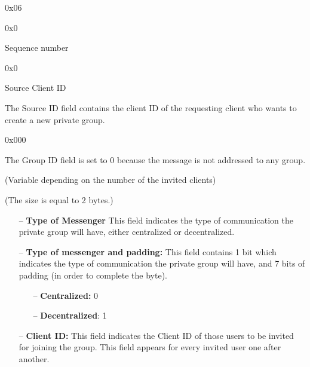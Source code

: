 \documentclass{article}
\begin{document}
\begin{description}[align=left]
    \item [Type:] 0x06
    
    \item [Reserved:] 0x0
        
    \item [Sequence:] Sequence number
    
    \item [Acknowledgement:] 0x0
        
    \item [Source ID:] Source Client ID
    \begin{flushleft}
        The Source ID field contains the client ID of the requesting client who wants to create a new private group. 
        
    \end{flushleft}
    
    \item [Group ID:] 0x000
    \begin{flushleft}
        The Group ID field is set to 0 because the message is not addressed to any group.
    \end{flushleft}
    
    \item [Header Length:] (Variable depending on the number of the invited clients)

    \item[Options:] (The size is equal to 2 bytes.)
    \begin{itemize}
        \item[--]\textbf{Type of Messenger} This field indicates the type of communication the private group will have, either centralized or decentralized.
    \end{itemize}
    \begin{itemize}
        \item[--]\textbf{Type of messenger and padding:} This field contains 1 bit which indicates the type of communication the private group will have, and 7 bits of padding (in order to complete the byte).
        \begin{itemize}
        \item[--]\textbf{Centralized:} 0
        \item[--]\textbf{Decentralized}: 1
        \end{itemize}
        \item[--]\textbf{Client ID:} This field indicates the Client ID of those users to be invited for joining the group. This field appears for every invited user one after another.
    \end{itemize}
\end{description}
\end{document}
